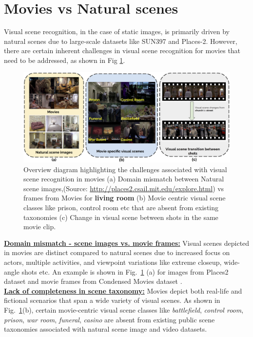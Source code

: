 \section{Movies vs Natural scenes}
Visual scene recognition, in the case of static images, is primarily driven by natural scenes due to large-scale datasets like SUN397 \cite{Xiao2010SUNDL} and Places-2\cite{zhou2017places}. However, there are certain inherent challenges in visual scene recognition for movies that need to be addressed, as shown in Fig \ref{Intro figure}.
\begin{figure}[!h]
 \centering
  \includegraphics[width=0.8\linewidth]{figures/Introduction_Figure.png}
  \caption{Overview diagram highlighting the challenges associated with visual scene recognition in movies (a) Domain mismatch between Natural scene images,(Source: \url{http://places2.csail.mit.edu/explore.html}) vs frames from Movies for \textbf{living room} (b) Movie centric visual scene classes like prison, control room etc that are absent from existing taxonomies (c) Change in visual scene between shots in the same movie clip.}
  \label{Intro figure}
\end{figure}
\textbf{\underline{Domain mismatch - scene images vs. movie frames:}} Visual scenes depicted in movies are distinct compared to natural scenes due to increased focus on actors, multiple activities, and viewpoint variations like extreme closeup, wide-angle shots etc. An example is shown in Fig.~\ref{Intro figure} (a) for images from Places2 dataset \cite{zhou2017places} and movie frames from Condensed Movies dataset \cite{bain2020condensed}.\\
\textbf{\underline{Lack of completeness in scene taxonomy:}} Movies depict both real-life and fictional scenarios that span a wide variety of visual scenes. As shown in Fig.~\ref{Intro figure}(b), certain movie-centric visual scene classes like \textit{battlefield}, \textit{control room}, \textit{prison}, \textit{war room}, \textit{funeral}, \textit{casino} are absent from existing public scene taxonomies associated with natural scene image and video datasets.\\
